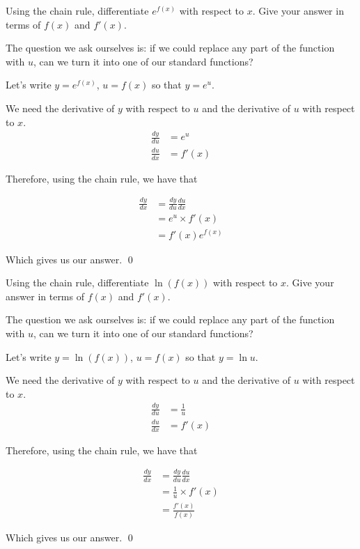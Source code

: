 \begin{example}
    Using the chain rule, differentiate $e^{f(x)}$ with respect to $x$. Give your answer in terms of $f(x)$ and $f'(x)$.
\end{example}
\begin{solution}

    The question we ask ourselves is: if we could replace any part of the function with $u$, can we turn it into one of our standard functions?

    Let's write $y = e^{f(x)}$, $u = f(x)$ so that $y = e^u$.

    We need the derivative of $y$ with respect to $u$ and the derivative of $u$ with respect to $x$.
    \begin{align*}
        \frac{dy}{du} &= e^u \tag{using the derivative of $e^u$} \\
        \frac{du}{dx} &= f'(x) \tag{in terms of $f'(x)$}
    \end{align*}

    Therefore, using the chain rule, we have that 

    \begin{align*}
        \frac{dy}{dx} &= \frac{dy}{du} \frac{du}{dx} \\
         &= e^u \times f'(x)  \tag{substituting our workings} \\
         &= f'(x)e^{f(x)} \tag{using $u = f(x)$}
    \end{align*}

    Which gives us our answer.
    \qed
\end{solution}

\begin{example}
    Using the chain rule, differentiate $\ln (f(x))$ with respect to $x$. Give your answer in terms of $f(x)$ and $f'(x)$.
\end{example}
\begin{solution}

    The question we ask ourselves is: if we could replace any part of the function with $u$, can we turn it into one of our standard functions?

    Let's write $y = \ln (f(x))$, $u = f(x)$ so that $y = \ln u$.

    We need the derivative of $y$ with respect to $u$ and the derivative of $u$ with respect to $x$.
    \begin{align*}
        \frac{dy}{du} &= \frac{1}{u} \tag{using the derivative of $\ln u$} \\
        \frac{du}{dx} &= f'(x) \tag{in terms of $f'(x)$}
    \end{align*}

    Therefore, using the chain rule, we have that 

    \begin{align*}
        \frac{dy}{dx} &= \frac{dy}{du} \frac{du}{dx} \\
         &= \frac{1}{u} \times f'(x)  \tag{substituting our workings} \\
         &= \frac{f'(x)}{f(x)} \tag{using $u = f(x)$}
    \end{align*}

    Which gives us our answer.
    \qed
\end{solution}

